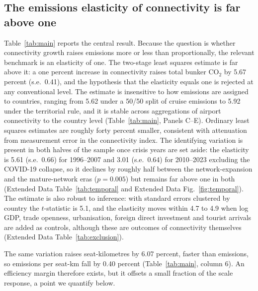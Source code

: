 \documentclass[12pt]{article}
\begin{document}
\subsection*{The emissions elasticity of connectivity is far above one}
Table~\ref{tab:main} reports the central result. Because the question is
whether connectivity growth raises emissions more or less than
proportionally, the relevant benchmark is an elasticity of one. The
two-stage least squares estimate is far above it: a one percent increase in
connectivity raises total bunker CO$_2$ by 5.67 percent (s.e.\ 0.41), and
the hypothesis that the elasticity equals one is rejected at any
conventional level. The estimate is insensitive to how emissions are
assigned to countries, ranging from 5.62 under a 50/50 split of cruise
emissions to 5.92 under the territorial rule, and it is stable across
aggregations of airport connectivity to the country level
(Table~\ref{tab:main}, Panels C--E). Ordinary least squares estimates are
roughly forty percent smaller, consistent with attenuation from measurement
error in the connectivity index. The identifying variation is present in
both halves of the sample once crisis years are set aside: the elasticity
is 5.61 (s.e.\ 0.66) for 1996--2007 and 3.01 (s.e.\ 0.64) for 2010--2023
excluding the COVID-19 collapse, so it declines by roughly half between the
network-expansion and the mature-network eras ($p = 0.005$) but remains far
above one in both (Extended Data Table~\ref{tab:temporal} and Extended Data
Fig.~\ref{fig:temporal}). The estimate is also robust to inference: with
standard errors clustered by country the $t$-statistic is 5.1, and the
elasticity moves within 4.7 to 4.9 when log GDP, trade openness,
urbanisation, foreign direct investment and tourist arrivals are added as
controls, although these are outcomes of connectivity themselves
(Extended Data Table~\ref{tab:exclusion}).

The same variation raises seat-kilometres by 6.07 percent, faster than
emissions, so emissions per seat-km fall by 0.40 percent
(Table~\ref{tab:main}, column 6). An efficiency margin therefore exists,
but it offsets a small fraction of the scale response, a point we quantify
below.

\end{document}
